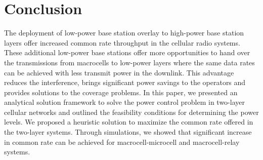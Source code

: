 \documentclass[conference,letterpaper,final,10pt]{IEEEtran}
\begin{document}
\section{Conclusion}\label{Conclusions}
The deployment of low-power base station overlay to high-power base station layers offer increased common rate throughput in the cellular radio systems. These additional low-power base stations offer more opportunities to hand over the transmissions from macrocells to low-power layers where the same data rates can be achieved with less transmit power in the downlink. This advantage reduces the interference, brings significant power savings to the operators and provides solutions to the coverage problems. In this paper, we presented an analytical solution framework to solve the power control problem in two-layer cellular networks and outlined the feasibility conditions for determining the power levels. We proposed a heuristic solution to maximize the common rate offered in the two-layer systems. Through simulations, we showed that significant increase in common rate can be achieved for macrocell-microcell and macrocell-relay systems.
\end{document}
